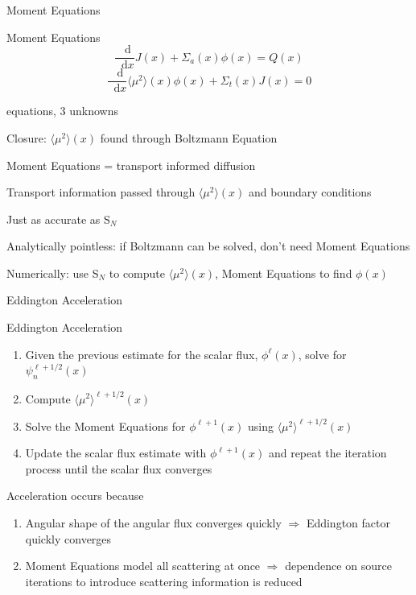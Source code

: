 \documentclass[10pt]{beamer}
\newcommand{\SN}{S$_N$\xspace}
\newcommand{\ud}{\mathop{}\!\mathrm{d}} %
\newcommand{\dderiv}[2]{\frac{\ud #1}{\ud #2}}
\newcommand{\edd}{\langle \mu^2 \rangle}
\begin{document}
\begin{frame}{Moment Equations}

	\begin{block}{Moment Equations}
	\begin{equation*}
		\dderiv{}{x} J(x) + \Sigma_a(x) \phi(x) = Q(x) \tag{\footnotesize Zeroth Moment}
	\end{equation*}
	\begin{equation*}
		\dderiv{}{x} \edd(x) \phi(x) 
		+ \Sigma_t(x) J(x) = 0 
		\tag{\footnotesize First Moment}
	\end{equation*}
	\end{block}

	 equations, 3 unknowns

	\pause 
	Closure: $\edd(x)$ found through Boltzmann Equation  

	\pause
	Moment Equations = transport informed diffusion

	\pause
	Transport information passed through $\edd(x)$ and boundary conditions

	\pause
	Just as accurate as \SN

	\pause 
	Analytically pointless: if Boltzmann can be solved, don't need Moment Equations 

	\pause 
	Numerically: use \SN to compute $\edd(x)$, Moment Equations to find $\phi(x)$

\end{frame}

\begin{frame}{Eddington Acceleration}

	\begin{exampleblock}{Eddington Acceleration}
	\begin{enumerate}
		\item Given the previous estimate for the scalar flux, $\phi^{\ell}(x)$, solve for $\psi_n^{\ell+1/2}(x)$

		\item \alert{Compute $\edd^{\ell+1/2}(x)$ }

		\item \alert{Solve the Moment Equations for $\phi^{\ell+1}(x)$ 
			using $\edd^{\ell+1/2}(x)$} 

		\item Update the scalar flux estimate with $\phi^{\ell+1}(x)$ and repeat the iteration process until the scalar flux converges
	\end{enumerate}
	\end{exampleblock}

	\pause
	Acceleration occurs because
	\begin{enumerate}
		\item Angular shape of the angular flux converges quickly $\Rightarrow$ Eddington factor quickly converges 

		\item Moment Equations model all scattering at once $\Rightarrow$ dependence on source iterations to introduce scattering information is reduced 

	\end{enumerate}

\end{frame}
\end{document}
